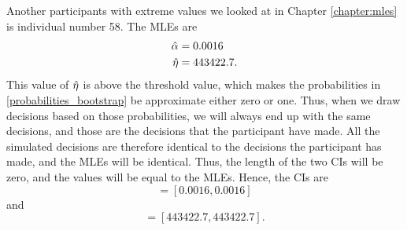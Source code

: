 Another participants with extreme values we looked at in Chapter \ref{chapter:mles} is individual number 58. The MLEs are 
\begin{equation*}
    \begin{aligned}
        \hat{\alpha} &= 0.0016\\
        \hat{\eta} &= 443422.7.
    \end{aligned}
\end{equation*}
This value of $\hat{\eta}$ is above the threshold value, which makes the probabilities in \eqref{probabilities_bootstrap} be approximate either zero or one. Thus, when we draw decisions based on those probabilities, we will always end up with the same decisions, and those are the decisions that the participant have made. All the simulated decisions are therefore identical to the decisions the participant has made, and the MLEs will be identical. Thus, the length of the two CIs will be zero, and the values will be equal to the MLEs. Hence, the CIs are
\begin{equation*}
    [\hat{\alpha}^{*(5)}_{1000},\hat{\alpha}^{*(95)}_{1000}] = [0.0016,0.0016]
\end{equation*}
and
\begin{equation*}
    [\hat{\eta}^{*(5)}_{1000},\hat{\eta}^{*(95)}_{1000}] = [443422.7,443422.7].
\end{equation*}

